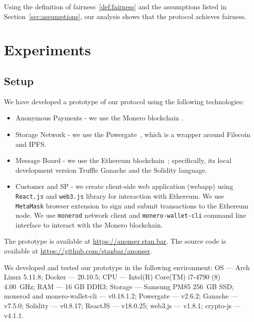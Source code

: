 \documentclass[pdftex,twocolumn,epjc3]{svjour3}
\begin{document}
{Using the definition of fairness~\ref{def:fairness} and the assumptions listed in Section~\ref{sec:assumptions}, our analysis shows that the protocol achieves fairness.

\section{Experiments}\label{sec:experiments}

\subsection*{Setup}

We have developed a prototype of our protocol using the following technologies:

\begin{itemize}
  \item{Anonymous Payments} - we use the Monero blockchain \cite{noetherRingSignatureConfidential2015}.
  \item{Storage Network} - we use the Powergate~\cite{textilePowergate2023}, which is a wrapper around Filecoin and IPFS.
  \item{Message Board} - we use the Ethereum blockchain~\cite{woodEthereumSecureDecentralised2014}; specifically, its local development version Truffle Ganache and the Solidity language.
\item{Customer and SP} - we create client-side web application (webapp) using \texttt{React.js} and \texttt{web3.js} library for interaction with Ethereum. We use \texttt{MetaMask} browser extension to sign and submit transactions to the Ethereum node. We use \texttt{monerod} network client and \texttt{monero-wallet-cli} command line interface to interact with the Monero blockchain.
\end{itemize}

The prototype is available at \url{https://anonser.stan.bar}. The source code is available at \url{https://github.com/stanbar/anonser}.


We developed and tested our prototype in the following environment: OS — Arch Linux 5.11.8; Docker — 20.10.5; CPU — Intel(R) Core(TM) i7-4790 (8) 4.00~GHz; RAM — 16 GB DDR3; Storage — Samsung PM85 256~GB SSD; monerod and monero-wallet-cli — v0.18.1.2; Powergate — v2.6.2; Ganache — v7.5.0; Solidity — v0.8.17; ReactJS — v18.0.25; web3.js — v1.8.1; crypto-js — v4.1.1.

}
\end{document}
